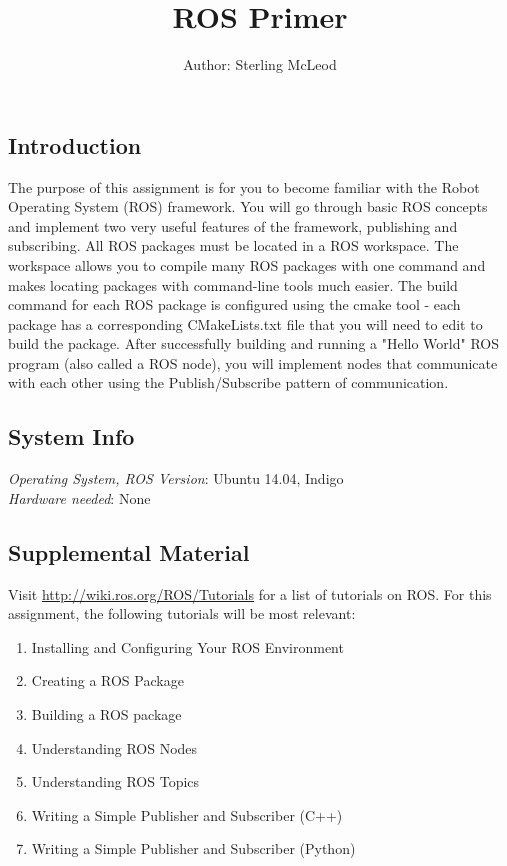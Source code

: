 \documentclass[12pt]{article}
\begin{document}
 
\title{ROS Primer}
\author{Author: Sterling McLeod}
\maketitle

\subsection*{Introduction}

The purpose of this assignment is for you to become familiar with the Robot Operating System (ROS) framework. You will go through basic ROS concepts and implement two very useful features of the framework, publishing and subscribing. All ROS packages must be located in a ROS workspace. The workspace allows you to compile many ROS packages with one command and makes locating packages with command-line tools much easier. The build command for each ROS package is configured using the cmake tool - each package has a corresponding CMakeLists.txt file that you will need to edit to build the package. After successfully building and running a "Hello World" ROS program (also called a ROS node), you will implement nodes that communicate with each other using the Publish/Subscribe pattern of communication. 

\subsection*{System Info}
\emph{Operating System, ROS Version}: Ubuntu 14.04, Indigo\\
\emph{Hardware needed}: None
 
\subsection*{Supplemental Material}

Visit \href{http://wiki.ros.org/ROS/Tutorials}{http://wiki.ros.org/ROS/Tutorials} for a list of tutorials on ROS. For this assignment, the following tutorials will be most relevant:

\begin{enumerate}
\item Installing and Configuring Your ROS Environment
\item Creating a ROS Package
\item Building a ROS package
\item Understanding ROS Nodes
\item Understanding ROS Topics
\item Writing a Simple Publisher and Subscriber (C++)
\item Writing a Simple Publisher and Subscriber (Python)
\end{enumerate}
\end{document}
